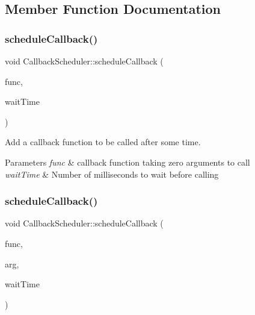 \subsection{Member Function Documentation}
\mbox{\label{class_callback_scheduler_a27a6883d1960c6fcd6082df62ddd7502}} 
\subsubsection{\texorpdfstring{scheduleCallback()}{scheduleCallback()}\hspace{0.1cm}{\footnotesize\ttfamily [1/2]}}
{\footnotesize\ttfamily void Callback\+Scheduler\+::schedule\+Callback (\begin{DoxyParamCaption}\item[{Callback\+Function0}]{func,  }\item[{Millisecond\+Timer\+::milliseconds}]{wait\+Time }\end{DoxyParamCaption})}



Add a callback function to be called after some time. 


\begin{DoxyParams}{Parameters}
{\em func} & callback function taking zero arguments to call \\
\hline
{\em wait\+Time} & Number of milliseconds to wait before calling \\
\hline
\end{DoxyParams}
\mbox{\label{class_callback_scheduler_a15c17b465fad7e85e1f3ea858dd39f7a}} 
\subsubsection{\texorpdfstring{scheduleCallback()}{scheduleCallback()}\hspace{0.1cm}{\footnotesize\ttfamily [2/2]}}
{\footnotesize\ttfamily void Callback\+Scheduler\+::schedule\+Callback (\begin{DoxyParamCaption}\item[{Callback\+Function1}]{func,  }\item[{u16}]{arg,  }\item[{Millisecond\+Timer\+::milliseconds}]{wait\+Time }\end{DoxyParamCaption})}



